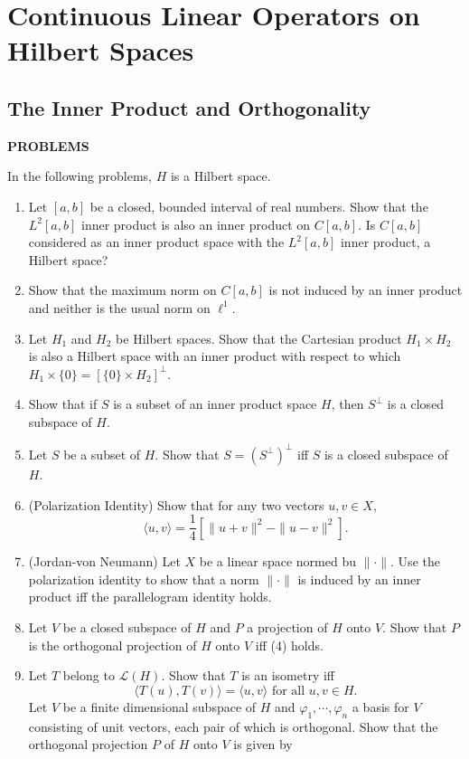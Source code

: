 \chapter{Continuous Linear Operators on Hilbert Spaces}

\section{The Inner Product and Orthogonality}
\begin{center}
	\textbf{PROBLEMS}
\end{center}
In the following problems, $H$ is a Hilbert space.
\begin{enumerate}
	\setcounter{enumi}{0}
    \item Let $[a,b]$ be a closed, bounded interval of real numbers. Show that the $L^2[a,b]$ inner product is also an inner product on $C[a,b]$. Is $C[a,b]$ considered as an inner product space with the $L^2[a,b]$ inner product, a Hilbert space?
    \item Show that the maximum norm on $C[a,b]$ is not induced by an inner product and neither is the usual norm on $\ell^1$.
    \item Let $H_1$ and $H_2$ be Hilbert spaces. Show that the Cartesian product $H_1\times H_2$ is also a Hilbert space with an inner product with respect to which $H_1\times\{0\}=[\{0\}\times H_2]^\perp$.
    \item Show that if $S$ is a subset of an inner product space $H$, then $S^\perp$ is a closed subspace of $H$.
    \item Let $S$ be a subset of $H$. Show that $S=(S^\perp)^\perp$ iff $S$ is a closed subspace of $H$.
    \item (Polarization Identity) Show that for any two vectors $u,v\in X$,
    \[
        \langle u,v \rangle = \frac{1}{4}[\|u+v\|^2-\|u-v\|^2].
    \]
    \item (Jordan-von Neumann) Let $X$ be a linear space normed bu $\|\cdot\|$. Use the polarization identity to show that a norm $\|\cdot\|$ is induced by an inner product iff the parallelogram identity holds.
    \item Let $V$ be a closed subspace of $H$ and $P$ a projection of $H$ onto $V$. Show that $P$ is the orthogonal projection of $H$ onto $V$ iff (4) holds.
    \item Let $T$ belong to $\mathcal{L}(H)$. Show that $T$ is an isometry iff
    \[
        \langle T(u),T(v)\rangle=\langle u,v\rangle\text{ for all }u,v\in H.
    \]
    Let $V$ be a finite dimensional subspace of $H$ and $\varphi_1,\cdots,\varphi_n$ a basis for $V$ consisting of unit vectors, each pair of which is orthogonal. Show that the orthogonal projection $P$ of $H$ onto $V$ is given by 

\end{enumerate}
